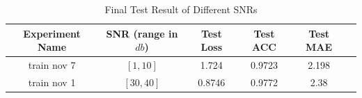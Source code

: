 \begin{table}[H]
    \centering
    \begin{tabular}{|c|c|c|c|c|c|}
        \hline
         Experiment Name& SNR (range in \(db\)) & Test Loss & Test ACC & Test MAE\\
         \hline
         train nov 7 & \([1, 10]\) & 1.724 & 0.9723 & 2.198\\
         \hline
         train nov 1 & \([30, 40]\) & 0.8746 & 0.9772 & 2.38\\
         \hline
    \end{tabular}
    \caption{Final Test Result of Different SNRs}
\end{table}